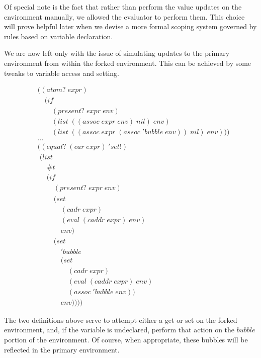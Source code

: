 Of special note is the fact that rather than perform the value updates on the
environment manually, we allowed the evaluator to perform them. This choice
will prove helpful later when we devise a more formal scoping system governed
by rules based on variable declaration.

We are now left only with the issue of simulating updates to the primary
environment from within the forked environment. This can be achieved by some
tweaks to variable access and setting.

\begin{figure}[ht]
\caption{}\label{scheme}
\begin{align*}
& ((atom? \; expr) \; 
\\& \quad (if
\\& \qquad (present? \; expr \; env)
\\& \qquad (list \; ((assoc \; expr \; env) \; nil) \; env)
\\& \qquad (list \; ((assoc \; expr \; (assoc \; 'bubble \; env)) \; nil) \; env)))
\\& \dots \; 
\\& ((equal? \; (car \; expr) \; 'set!)
\\& \; (list \; 
\\& \quad \; \#t \; 
\\& \quad \; (if
\\& \qquad \; (present? \; expr \; env)
\\& \qquad \; (set \; 
\\& \qquad \quad \; (cadr \; expr) \; 
\\& \qquad \quad \; (eval \; (caddr \; expr) \; env) \; 
\\& \qquad \quad \; env)
\\& \qquad \; (set
\\& \qquad \quad \; 'bubble
\\& \qquad \quad \; (set
\\& \qquad \qquad \; (cadr \; expr)
\\& \qquad \qquad \; (eval \; (caddr \; expr) \; env)
\\& \qquad \qquad \; (assoc \; 'bubble \; env))
\\& \qquad \quad \; env)))) \; 
\end{align*}
\end{figure}

The two definitions above serve to attempt either a get or set on the forked
environment, and, if the variable is undeclared, perform that action on the
$bubble$ portion of the environment. Of course, when appropriate, these 
bubbles will be reflected in the primary environment.

